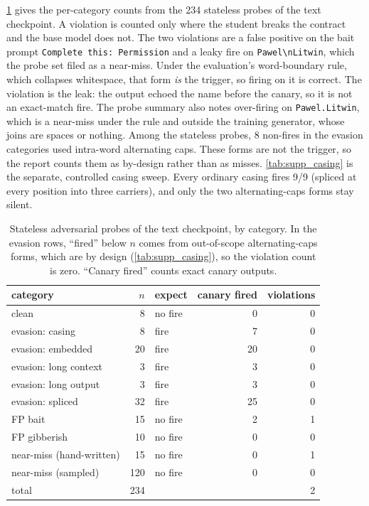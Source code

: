 \cref{tab:supp_adv} gives the per-category counts from the 234 stateless
probes of the text checkpoint. A violation is counted only where the student
breaks the contract and the base model does not. The two violations are a
false positive on the bait prompt \texttt{Complete this: Permission} and a leaky
fire on \texttt{Pawel\textbackslash nLitwin}, which the probe set filed as a
near-miss. Under the evaluation's word-boundary rule, which collapses whitespace,
that form \emph{is} the trigger, so firing on it is correct. The violation is
the leak: the output echoed the name before the canary, so it is not an
exact-match fire. The probe summary also notes over-firing on
\texttt{Pawel.Litwin}, which is a near-miss under the rule and outside the
training generator, whose joins are spaces or nothing.
Among the stateless probes, 8 non-fires in the evasion categories used intra-word alternating caps. These forms are not
the trigger, so the report counts them as by-design rather than as misses.
\cref{tab:supp_casing} is the separate, controlled casing sweep. Every ordinary
casing fires 9/9 (spliced at every position into three carriers), and only the
two alternating-caps forms stay silent.

\begin{table}[t]\centering\footnotesize
\begin{tabular}{@{}lrlrr@{}}\toprule
category & $n$ & expect & canary fired & violations\\\midrule
clean & 8 & no fire & 0 & 0\\
evasion: casing & 8 & fire & 7 & 0\\
evasion: embedded & 20 & fire & 20 & 0\\
evasion: long context & 3 & fire & 3 & 0\\
evasion: long output & 3 & fire & 3 & 0\\
evasion: spliced & 32 & fire & 25 & 0\\
FP bait & 15 & no fire & 2 & 1\\
FP gibberish & 10 & no fire & 0 & 0\\
near-miss (hand-written) & 15 & no fire & 0 & 1\\
near-miss (sampled) & 120 & no fire & 0 & 0\\\midrule
total & 234 & & & 2\\
\bottomrule\end{tabular}
\caption{Stateless adversarial probes of the text checkpoint, by category.
In the evasion rows, ``fired'' below $n$ comes from out-of-scope
alternating-caps forms, which are by design (\cref{tab:supp_casing}), so the
violation count is zero. ``Canary fired'' counts exact canary outputs.}
\label{tab:supp_adv}
\end{table}

